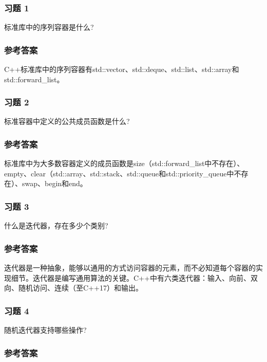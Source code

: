 \subsubsection{习题 1}

标准库中的序列容器是什么?

\subsubsection{参考答案}

C++标准库中的序列容器有std::vector、std::deque、std::list、std::array和std::forward\_list。


\subsubsection{习题 2}

标准容器中定义的公共成员函数是什么?

\subsubsection{参考答案}

标准库中为大多数容器定义的成员函数是size（std::forward\_list中不存在）、empty、clear（std::array、std::stack、std::queue和std::priority\_queue中不存在）、swap、begin和end。

\subsubsection{习题 3}

什么是迭代器，存在多少个类别?

\subsubsection{参考答案}

迭代器是一种抽象，能够以通用的方式访问容器的元素，而不必知道每个容器的实现细节。迭代器是编写通用算法的关键。C++中有六类迭代器：输入、向前、双向、随机访问、连续（至C++17）和输出。

\subsubsection{习题 4}

随机迭代器支持哪些操作?

\subsubsection{参考答案}

